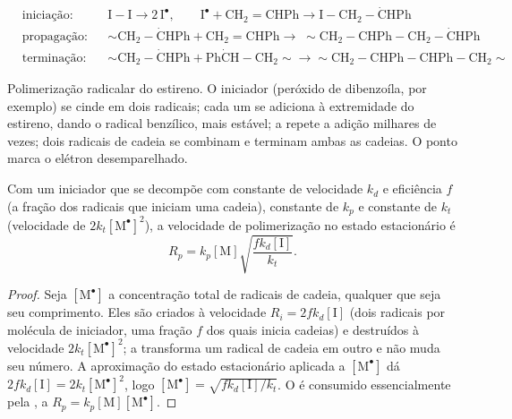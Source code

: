 \begin{omfigure}
\begin{align*}
&\text{iniciação:} && \mathrm{I{-}I} \longrightarrow 2\,\mathrm{I^{\bullet}}, \qquad
\mathrm{I^{\bullet} + CH_2{=}CHPh \longrightarrow I{-}CH_2{-}\dot{C}HPh} \\
&\text{propagação:} && {\sim}\mathrm{CH_2{-}\dot{C}HPh + CH_2{=}CHPh \longrightarrow}\;
{\sim}\mathrm{CH_2{-}CHPh{-}CH_2{-}\dot{C}HPh} \\
&\text{terminação:} && {\sim}\mathrm{CH_2{-}\dot{C}HPh + Ph\dot{C}H{-}CH_2}{\sim} \longrightarrow
{\sim}\mathrm{CH_2{-}CHPh{-}CHPh{-}CH_2}{\sim}
\end{align*}

{\small Polimerização radicalar do estireno. O iniciador  (peróxido de dibenzoíla, por exemplo)
se cinde em dois radicais; cada um se adiciona à extremidade  do estireno, dando o radical
benzílico, mais estável; a  repete a adição milhares de vezes; dois radicais de cadeia se
combinam e terminam ambas as cadeias. O ponto marca o elétron desemparelhado.}
\end{omfigure}

\begin{theorem}\label{thm:b2:polymer-synthesis:radical-rate}
Com um iniciador que se decompõe com constante de velocidade $k_d$ e eficiência $f$ (a fração dos
radicais que iniciam uma cadeia), constante de  $k_p$ e constante de  $k_t$
(velocidade de  $2k_t
[\mathrm{M^\bullet}]^2$), a velocidade de polimerização no estado estacionário é
\begin{equation*}
R_p = k_p [\mathrm M] \sqrt{\frac{f k_d [\mathrm I]}{k_t}}.
\end{equation*}
\end{theorem}

\begin{proof}
Seja $[\mathrm{M^\bullet}]$ a concentração total de radicais de cadeia, qualquer que seja seu
comprimento. Eles são criados à velocidade $R_i = 2fk_d[\mathrm I]$ (dois radicais por molécula de
iniciador, uma fração $f$ dos quais inicia cadeias) e destruídos à velocidade $2k_t[\mathrm{M^\bullet}]^2$;
a  transforma um radical de cadeia em outro e não muda seu número. A aproximação do estado
estacionário aplicada a
$[\mathrm{M^\bullet}]$ dá $2fk_d[\mathrm I] = 2k_t[\mathrm{M^\bullet}]^2$, logo $[\mathrm{M^\bullet}] =
\sqrt{fk_d[\mathrm I]/k_t}$. O  é consumido essencialmente pela , a $R_p =
k_p[\mathrm M][\mathrm{M^\bullet}]$.
\end{proof}

